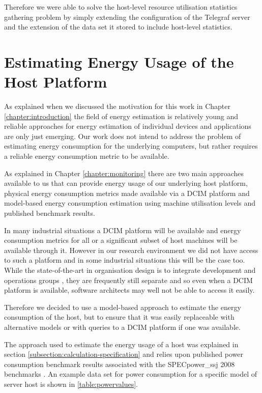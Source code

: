Therefore we were able to solve the host-level resource utilisation statistics gathering problem by simply extending the configuration of the Telegraf server and the extension of the data set it stored to include host-level statistics.

\section{Estimating Energy Usage of the Host Platform}

As explained when we discussed the motivation for this work in Chapter \ref{chapter:introduction} the field of energy estimation is relatively young and reliable approaches for energy estimation of individual devices and applications are only just emerging.  Our work does not intend to address the problem of estimating energy consumption for the underlying computers, but rather requires a reliable energy consumption metric to be available.

As explained in Chapter \ref{chapter:monitoring} there are two main approaches available to us that can provide energy usage of our underlying host platform, physical energy consumption metrics made available via a DCIM platform and model-based energy consumption estimation using machine utilisation levels and published benchmark results.

In many industrial situations a DCIM platform will be available and energy consumption metrics for all or a significant subset of host machines will be available through it.  However in our research environment we did not have access to such a platform and in some industrial situations this will be the case too.  While the state-of-the-art in organisation design is to integrate development and operations groups \cite{kim2016-devops}, they are frequently still separate and so even when a DCIM platform is available, software architects may well not be able to access it easily.

Therefore we decided to use a model-based approach to estimate the energy consumption of the host, but to ensure that it was easily replaceable with alternative models or with queries to a DCIM platform if one was available.

The approach used to estimate the energy usage of a host was explained in section \ref{subsection:calculation-specification} and relies upon published power consumption benchmark results associated with the SPECpower\_ssj 2008 benchmarks \cite{lange2009-specpower}.  An example data set for power consumption for a specific model of server host is shown in \ref{table:powervalues}.

